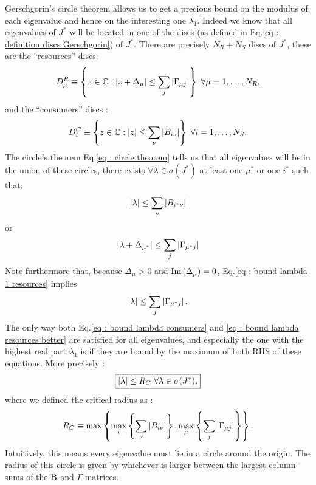 \documentclass[12pt]{report}
\begin{document}
Gerschgorin's circle theorem allows us to get a precious bound on the modulus of each eigenvalue and hence on the interesting one $\lambda_1$. Indeed we know that all eigenvalues of $J^*$ will be located in one of the discs (as defined in Eq.\eqref{eq : definition discs Gerschgorin}) of $J^*$. There are precisely $N_R + N_S$ discs of $J^*$, these are the ``resources'' discs:
\begin{equation}
D^R_\mu  \equiv \left\{ z \in \mathbb{C} : \left|{z+\Delta_\mu}\right| \leq \sum_j \left|{\Gamma_{\mu j}}\right| \right\}  \ \forall \mu = 1, \dots, N_R,
\end{equation}
and the ``consumers'' discs :
\begin{equation}
D^C_i \equiv \left\{ z \in \mathbb{C} : \left|{z}\right| \leq \sum_\nu \left|{B_{i\nu}}\right|\right\} \ \forall i=1, \dots, N_S.
\end{equation}
The circle's theorem Eq.\eqref{eq : circle theorem} tells us that all eigenvalues will be in the union of these circles, \ie there exists $\forall \lambda \in \sigma\left(J^*\right)$ at least one $\mu^*$ or  one $i^*$ such that:
\begin{equation}
\left|{\lambda}\right| \leq \sum_\nu \left|{B_{i^*\nu}}\right| \label{eq : bound lambda consumers}
\end{equation}
or
\begin{equation}
\left|{\lambda+\Delta_{\mu^*}}\right| \leq \sum_j \left|{\Gamma_{\mu^* j}}\right| \label{eq : bound lambda 1 resources}
\end{equation}
Note furthermore that, because $\Delta_\mu > 0$ and $\text{Im}\left(\Delta_\mu\right)=0$, Eq.\eqref{eq : bound lambda 1 resources} implies
\begin{equation}
\left|{\lambda}\right| \leq \sum_j \left|{\Gamma_{\mu^* j}}\right|. \label{eq : bound lambda resources better}
\end{equation}
The only way both Eq.\eqref{eq : bound lambda consumers} and \eqref{eq : bound lambda resources better} are satisfied for all eigenvalues, and especially the one with the highest real part $\lambda_1$ is if they are bound by the maximum of both RHS of these equations. More precisely :
\begin{equation}
\boxed{
\left|{\lambda}\right| \leq R_C \ \forall \lambda \in \sigma(J^*), \label{eq : overall bound on lambda}
}
\end{equation}
where we defined the critical radius as :
\begin{equation}
R_C \equiv \max\left\{\max_i\left\{\sum_\nu \left|{B_{i\nu}}\right|\right\}, \max_\mu\left\{\sum_j \left|{\Gamma_{\mu j}}\right|\right\}\right\}.
\end{equation}
Intuitively, this means every eigenvalue must lie in a circle around the origin. The radius of this circle is given by whichever is larger between the largest column-sums of the $\text{B}$ and $\Gamma$ matrices.
\end{document}
